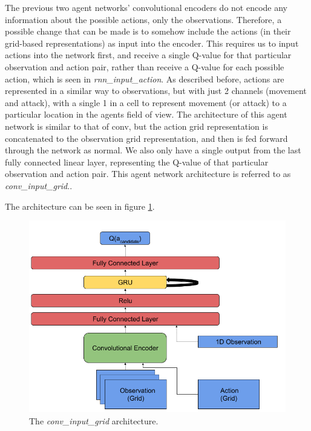 The previous two agent networks’ convolutional encoders do not encode any information about the possible actions, only the observations. Therefore, a possible change that can be made is to somehow include the actions (in their grid-based representations) as input into the encoder. This requires us to input actions into the network first, and receive a single Q-value for that particular observation and action pair, rather than receive a Q-value for each possible action, which is seen in \textit{rnn\_input\_action}. As described before, actions are represented in a similar way to observations, but with just 2 channels (movement and attack), with a single 1 in a cell to represent movement (or attack) to a particular location in the agents field of view. The architecture of this agent network is similar to that of conv, but the action grid representation is concatenated to the observation grid representation, and then is fed forward through the network as normal. We also only have a single output from the last fully connected linear layer, representing the Q-value of that particular observation and action pair. This agent network architecture is referred to as \textit{conv\_input\_grid}..

The architecture can be seen in figure \ref{fig:conv_input_grid_agent_diagram}.

\begin{figure}
    \centering
    \includegraphics[scale=0.3]{images/agent_diagrams/rnn_conv_ddpg_input_grid_agent_diagram.png}
    \caption{The \textit{conv\_input\_grid} architecture.}
    \label{fig:conv_input_grid_agent_diagram}
\end{figure}





